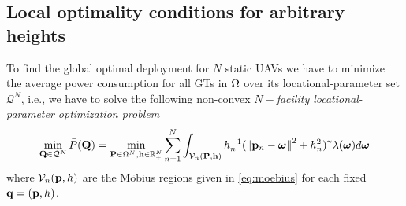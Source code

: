 \documentclass[smallabstract,smallcaptions]{dccpaper}
\newcommand{\df}{\ensuremath{\lam}}         %
\newcommand{\bH}{\ensuremath{\vh}}          %
\newcommand{\Pbar}{\ensuremath{\bar{P}}}         %
\newcommand{\Vor}{\ensuremath{\mathcal{V}}}         %
\newcommand{\Qset}{\ensuremath{\mathcal Q}}
\begin{document}
\subsection{Local optimality conditions for arbitrary heights}
%
To find the global optimal deployment for $N$ static UAVs we have to minimize the average power consumption for all GTs
in $\Omega$ over its locational-parameter set $\Qset^N$, i.e., we have to solve the following non-convex
\emph{$N-$facility locational-parameter optimization problem} \cite{WJ18} 
%
\begin{align}
  \min_{\vQ\in\Qset^N} \Pbar(\vQ)= \min_{\vP\in\Omega^N,\bH\in \R_+^N} \sum_{n=1}^{N} \int_{\Vor_n(\vP,\bH)}
  h_n^{-1}(\Norm{\vp_n-\vome}^2 +h_n^2)^{\gam}\df(\vome)d\vome\label{eq:phoptlocal} 
\end{align}
%
where $\Vor_n(\vp,h)$ are the Möbius regions given in \eqref{eq:moebius} for each fixed ${\mathbf q}=({\mathbf p},h)$.
\end{document}

